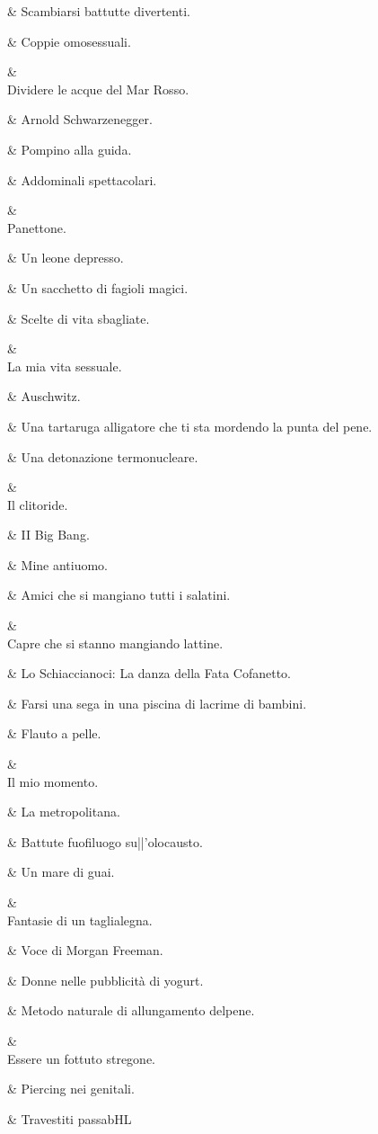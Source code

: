 &
Scambiarsi
battutte
divertenti.

&
Coppie
omosessuali.

&
\\
Dividere le acque
del Mar Rosso.

&
Arnold
Schwarzenegger.

&
Pompino alla
guida.

&
Addominali
spettacolari.

&
\\
Panettone.

&
Un leone
depresso.

&
Un sacchetto di
fagioli magici.

&
Scelte di vita
sbagliate.

&
\\
La mia vita
sessuale.

&
Auschwitz.

&
Una tartaruga
alligatore che ti
sta mordendo la
punta del pene.

&
Una detonazione
termonucleare.

&
\\
Il clitoride.

&
II Big Bang.

&
Mine antiuomo.

&
Amici che si
mangiano tutti i
salatini.

&
\\
Capre che
si stanno
mangiando
lattine.

&
Lo
Schiaccianoci:
La danza della
Fata Cofanetto.

&
Farsi una sega
in una piscina
di lacrime di
bambini.

&
Flauto a pelle.

&
\\
Il mio momento.

&
La metropolitana.

&
Battute
fuoﬁluogo
su||’olocausto.

&
Un mare di guai.

&
\\
Fantasie di un
taglialegna.

&
Voce di Morgan
Freeman.

&
Donne nelle
pubblicità di
yogurt.

&
Metodo naturale
di allungamento
delpene.

&
\\
Essere un fottuto
stregone.

&
Piercing nei
genitali.

&
Travestiti
passabHL

